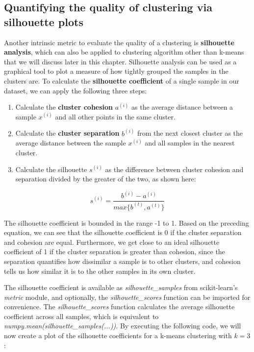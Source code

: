 \documentclass[11pt]{article}
\providecommand{\tightlist}{%
      \setlength{\itemsep}{0pt}\setlength{\parskip}{0pt}}
\begin{document}
    \subsection{Quantifying the quality of clustering via silhouette
plots}\label{quantifying-the-quality-of-clustering-via-silhouette-plots}

    Another intrinsic metric to evaluate the quality of a clustering is
\textbf{silhouette analysis}, which can also be applied to clustering
algorithm other than k-means that we will discuss later in this chapter.
Silhouette analysis can be used as a graphical tool to plot a measure of
how tightly grouped the samples in the clusters are. To calculate the
\textbf{silhouette coefficient} of a single sample in our dataset, we
can apply the following three steps:

\begin{enumerate}
\def\labelenumi{\arabic{enumi}.}
\tightlist
\item
  Calculate the \textbf{cluster cohesion} \(a^{(i)}\) as the average
  distance between a sample \(x^{(i)}\) and all other points in the same
  cluster.
\item
  Calculate the \textbf{cluster separation} \(b^{(i)}\) from the next
  closest cluster as the average distance between the sample \(x^{(i)}\)
  and all samples in the nearest cluster.
\item
  Calculate the silhouette \(s^{(i)}\) as the difference between cluster
  cohesion and separation divided by the greater of the two, as shown
  here:
\end{enumerate}

\[s^{(i)} = \frac{b^{(i)}-a^{(i)}}{max\{b^{(t)}, a^{(t)}\}}\]

The silhouette coefficient is bounded in the range -1 to 1. Based on the
preceding equation, we can see that the silhouette coefficient is 0 if
the cluster separation and cohesion are equal. Furthermore, we get close
to an ideal silhouette coefficient of 1 if the cluster separation is
greater than cohesion, since the separation quantifies how dissimilar a
sample is to other clusters, and cohesion tells us how similar it is to
the other samples in its own cluster.

The silhouette coefficient is available as \emph{silhouette\_samples}
from scikit-learn's \emph{metric} module, and optionally, the
\emph{silhouette\_scores} function can be imported for convenience. The
\emph{silhouette\_scores} function calculates the average silhouette
coefficient across all samples, which is equivalent to
\emph{numpy.mean(silhouette\_samples(...))}. By executing the following
code, we will now create a plot of the silhouette coefficients for a
k-means clustering with \(k=3\):
\end{document}
